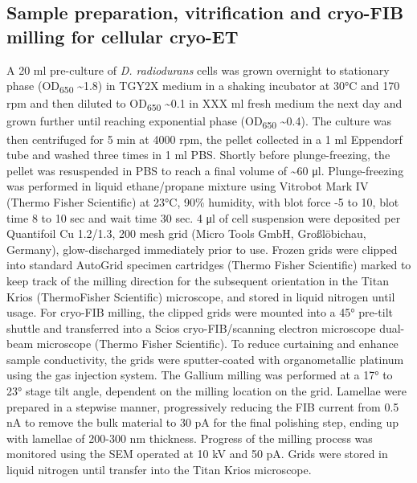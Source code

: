 \subsection{Sample preparation, vitrification and cryo-FIB milling for cellular cryo-ET}
A 20 ml pre-culture of \textit{D. radiodurans} cells was grown overnight to stationary phase (OD\textsubscript{650} \sim1.8) in TGY2X medium in a shaking incubator at 30°C and 170 rpm and then diluted to OD\textsubscript{650} \sim0.1 in XXX ml fresh medium the next day and grown further until reaching exponential phase (OD\textsubscript{650} \sim0.4).
The culture was then centrifuged for 5 min at 4000 rpm, the pellet collected in a 1 ml Eppendorf tube and washed three times in 1 ml PBS.
Shortly before plunge-freezing, the pellet was resuspended in PBS to reach a final volume of \sim60 μl.
Plunge-freezing was performed in liquid ethane/propane mixture using Vitrobot Mark IV (Thermo Fisher Scientific) at 23°C, 90\% humidity, with blot force -5 to 10, blot time 8 to 10 sec and wait time 30 sec.
4 μl of cell suspension were deposited per Quantifoil Cu 1.2/1.3, 200 mesh grid (Micro Tools GmbH, Großlöbichau, Germany), glow-discharged immediately prior to use.
Frozen grids were clipped into standard AutoGrid specimen cartridges (Thermo Fisher Scientific) marked to keep track of the milling direction for the subsequent orientation in the Titan Krios (ThermoFisher Scientific) microscope, and stored in liquid nitrogen until usage.
For cryo-FIB milling, the clipped grids were mounted into a 45° pre-tilt shuttle and transferred into a Scios cryo-FIB/scanning electron microscope dual-beam microscope (Thermo Fisher Scientific).
To reduce curtaining and enhance sample conductivity, the grids were sputter-coated with organometallic platinum using the gas injection system.
The Gallium milling was performed at a 17° to 23° stage tilt angle, dependent on the milling location on the grid.
Lamellae were prepared in a stepwise manner, progressively reducing the FIB current from 0.5 nA to remove the bulk material to 30 pA for the final polishing step, ending up with lamellae of 200-300 nm thickness.
Progress of the milling process was monitored using the SEM operated at 10 kV and 50 pA.
Grids were stored in liquid nitrogen until transfer into the Titan Krios microscope.

